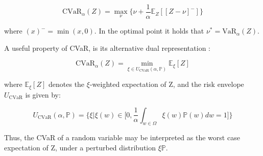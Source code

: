 \begin{equation}
    \text{CVaR}_\alpha (Z) = \underset{\nu} \max \big\{\nu + \frac{1}{\alpha} \mathbb E_Z[[Z- \nu]^-]\big\}
\end{equation}

where $(x)^- = \min(x,0)$. In the optimal point it holds that $\nu^*=\text{VaR}_\alpha(Z)$.

A useful property of CVaR, is its alternative dual representation \cite{Artzner1999}:

\begin{equation}
    \text{CVaR}_\alpha (Z) = \underset{\xi \in U_{\text{CVaR}} (\alpha, \mathbb{P})} \min \mathbb E_\xi[Z]
\end{equation}

where $\mathbb E_\xi[Z]$ denotes the $\xi$-weighted expectation of Z, and the risk envelope $U_\text{CVaR}$ is
given by:

\begin{equation}
    U_{\text{CVaR}}(\alpha, \mathbb{P}) = \Big\{\xi | \xi(w)  \in \big [ 0, \frac{1}{\alpha} \int_{w\in\Omega} \xi(w)\mathbb{P}(w)dw=1   \big ] \Big\}
\end{equation}

Thus, the CVaR of a random variable may be interpreted as the worst case expectation of Z, under
a perturbed distribution $\xi \mathbb{P}$.
